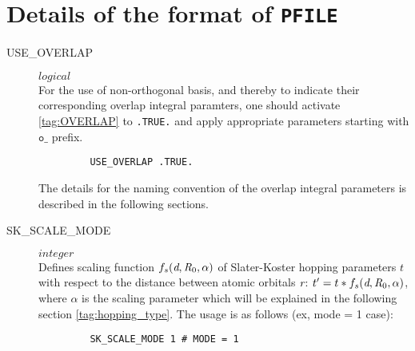 \documentclass[a4paper,12pt]{scrartcl}
\makeatletter
\def\namedlabel#1#2{\begingroup
    #2%
    \def\@currentlabel{#2}%
    \phantomsection\label{#1}\endgroup
}
\makeatother
\begin{document}
\section{Details of the format of \texttt{PFILE}}\label{tag:PFILE-detail}
\begin{description}
	\item[\namedlabel{tag:OVERLAP}{USE\_OVERLAP}]  $logical$ \\
		For the use of non-orthogonal basis, and thereby to indicate their corresponding overlap integral paramters, 
		one should activate \ref{tag:OVERLAP} to \texttt{.TRUE.} and apply appropriate parameters starting with $\texttt{o\_}$ prefix.
        \begin{verbatim}
         USE_OVERLAP .TRUE.
        \end{verbatim}
        
		The details for the naming convention of the overlap integral parameters is described in the following sections. 

	\item[\namedlabel{tag:SKSCALEMODE}{SK\_SCALE\_MODE}]  $integer$ \\
		Defines scaling function $f_s(\emph{d},\emph{R}_0,\alpha)$ of Slater-Koster hopping parameters $t$ with respect to the distance between atomic orbitals $\emph{r}$: $t' = t * f_s(\emph{d},\emph{R}_0,\alpha)$, where $\alpha$ is the scaling parameter which will be explained in the following section \ref{tag:hopping_type}. 
		The usage is as follows (ex, mode = 1 case):
	    \begin{verbatim}
         SK_SCALE_MODE 1 # MODE = 1
        \end{verbatim}


\end{description}
\end{document}
